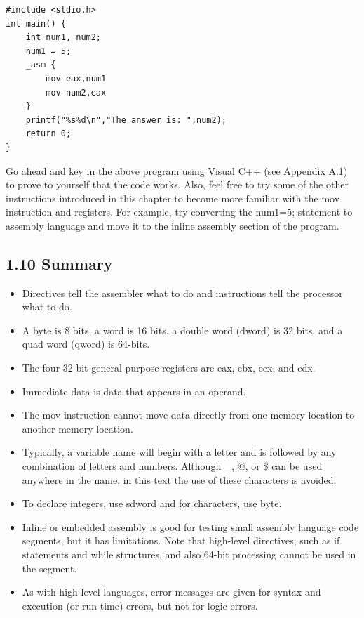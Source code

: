 \documentclass[10pt]{article}
\begin{document}
\begin{verbatim}
#include <stdio.h>
int main() {
    int num1, num2;
    num1 = 5;
    _asm {
        mov eax,num1
        mov num2,eax
    }
    printf("%s%d\n","The answer is: ",num2);
    return 0;
}
\end{verbatim}

Go ahead and key in the above program using Visual C++ (see Appendix A.1) to prove to yourself that the code works. Also, feel free to try some of the other instructions introduced in this chapter to become more familiar with the mov instruction and registers. For example, try converting the num1=5; statement to assembly language and move it to the inline assembly section of the program.

\subsection*{1.10 Summary}
\begin{itemize}
  \item Directives tell the assembler what to do and instructions tell the processor what to do.
  \item A byte is 8 bits, a word is 16 bits, a double word (dword) is 32 bits, and a quad word (qword) is 64-bits.
  \item The four 32-bit general purpose registers are eax, ebx, ecx, and edx.
  \item Immediate data is data that appears in an operand.
  \item The mov instruction cannot move data directly from one memory location to another memory location.
  \item Typically, a variable name will begin with a letter and is followed by any combination of letters and numbers. Although \_, @, or \$ can be used anywhere in the name, in this text the use of these characters is avoided.
  \item To declare integers, use sdword and for characters, use byte.
  \item Inline or embedded assembly is good for testing small assembly language code segments, but it has limitations. Note that high-level directives, such as if statements and while structures, and also 64-bit processing cannot be used in the segment.
  \item As with high-level languages, error messages are given for syntax and execution (or run-time) errors, but not for logic errors.
\end{itemize}
\end{document}
